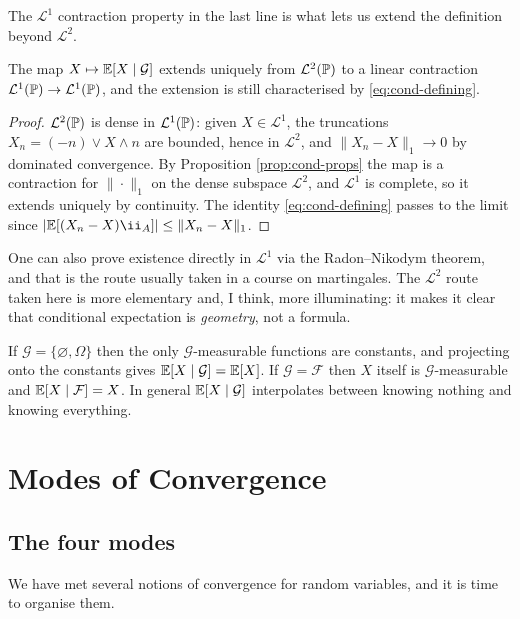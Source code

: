 \documentclass[a4paper]{scrartcl}
\newcommand{\cF}{\mathcal{F}}
\newcommand{\cG}{\mathcal{G}}
\newcommand{\cL}{\mathcal{L}}
\newcommand{\ind}{\ii}
\begin{document}
The $\cL^1$ contraction property in the last line is what lets us extend the definition beyond $\cL^2$.

\begin{theorem}[Extension to $\cL^1$]\label{thm:cond-l1}
	The map $X \mapsto \EE[X\mid\cG]$ extends uniquely from $\cL^2(\PP)$ to a linear contraction $\cL^1(\PP)\to\cL^1(\PP)$, and the extension is still characterised by \eqref{eq:cond-defining}.
\end{theorem}
\begin{proof}
	$\cL^2(\PP)$ is dense in $\cL^1(\PP)$: given $X \in \cL^1$, the truncations $X_n = (-n)\vee X\wedge n$ are bounded, hence in $\cL^2$, and $\|X_n - X\|_1 \to 0$ by dominated convergence. By Proposition \ref{prop:cond-props} the map is a contraction for $\|\cdot\|_1$ on the dense subspace $\cL^2$, and $\cL^1$ is complete, so it extends uniquely by continuity. The identity \eqref{eq:cond-defining} passes to the limit since $|\EE[(X_n - X)\ind_A]| \leq \|X_n - X\|_1$.
\end{proof}

\begin{remark}
	One can also prove existence directly in $\cL^1$ via the Radon--Nikodym theorem, and that is the route usually taken in a course on martingales. The $\cL^2$ route taken here is more elementary and, I think, more illuminating: it makes it clear that conditional expectation is \emph{geometry}, not a formula.
\end{remark}

\begin{example}
	If $\cG = \{\varnothing,\Omega\}$ then the only $\cG$-measurable functions are constants, and projecting onto the constants gives $\EE[X\mid\cG]=\EE[X]$. If $\cG = \cF$ then $X$ itself is $\cG$-measurable and $\EE[X\mid\cF]=X$. In general $\EE[X\mid\cG]$ interpolates between knowing nothing and knowing everything.
\end{example}
\section{Modes of Convergence}

\subsection{The four modes}

We have met several notions of convergence for random variables, and it is time to organise them.
\end{document}
